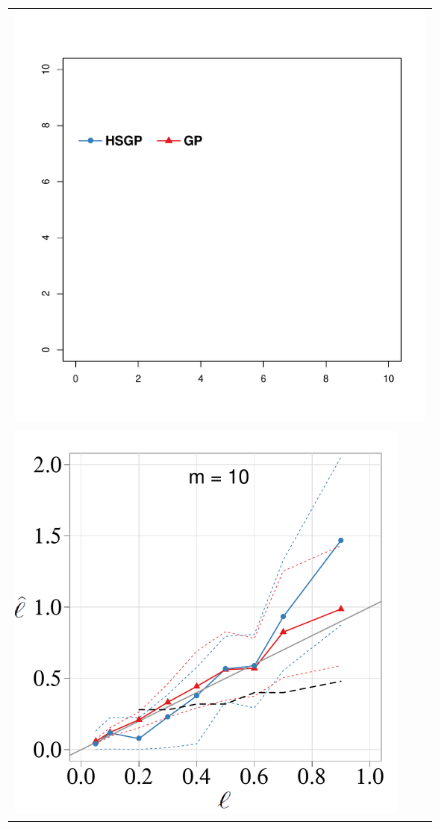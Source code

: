 \documentclass[onecolumn,a4paper,11pt]{article}
\begin{document}
\begin{figure}
\begin{flushleft}
\begin{tabular}{ccc}
\multicolumn{3}{c}{ \includegraphics[scale=0.42, trim = 25mm 117mm 90mm 45mm, clip]{ch5_fig8_legend.pdf}}\\
\includegraphics[scale=0.31, trim = 0mm 24mm 7mm 10mm, clip]{ch5_fig8_Tlscale_vs_Elscale_part1.pdf} & \hspace{-4mm}

\end{tabular}
\end{flushleft}
\end{figure}
\end{document}
